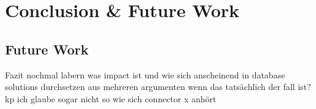 \documentclass[sigconf]{acmart}
\begin{document}
\section{Conclusion & Future Work}

\subsection{Future Work}
Fazit nochmal labern was impact ist und wie sich anscheinend in database solutions durchsetzen aus mehreren argumenten wenn das tatsächlich der fall ist? kp
ich glaube sogar nicht so wie sich connector x anhört




\end{document}
